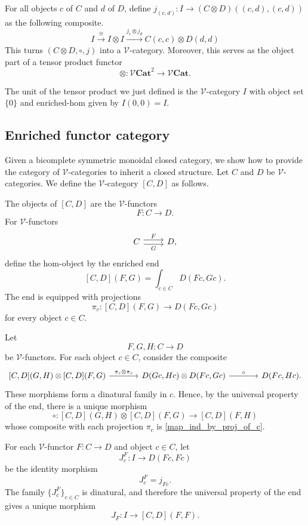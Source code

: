 \documentclass{tac}
\begin{document}
For all objects $c$ of $C$ and $d$ of $D$, define $j_{(c,d)}:I\to (C\otimes D)((c,d),(c,d))$ as the following composite.
\[
I\xrightarrow{\cong}I\otimes I\xrightarrow{j_c\otimes j_d}C(c,c)\otimes D(d,d)
\]
This turns $(C\otimes D,\circ,j)$ into a $\mathcal{V}$-category. Moreover, this serves as the object part of a tensor product functor 
\[
\otimes:\mathcal{V}\mathbf{Cat}^2\to\mathcal{V}\mathbf{Cat}.
\]

The unit of the tensor product we just defined is the $\mathcal{V}$-category $I$ with object set $\{0\}$ and enriched-hom given by $I(0,0)=I$.

\subsection*{Enriched functor category}
Given a bicomplete symmetric monoidal closed category, we show how to provide the category of
$\mathcal{V}$-categories to inherit a closed structure. Let $C$ and $D$ be $\mathcal{V}$-categories. We define the
$\mathcal{V}$-category $[C,D]$ as follows.

The objects of $[C,D]$ are the $\mathcal{V}$-functors
\[
F:C\longrightarrow D.
\]
For $\mathcal{V}$-functors 
\[
\begin{tikzcd}
C
  \arrow[r, shift left=0.6ex, "F"]
  \arrow[r, shift right=0.6ex, swap, "G"]
&
D,
\end{tikzcd}
\]
define the hom-object by
the enriched end
\[
[C,D](F,G)=\int_{c\in C}D(Fc,Gc).
\]
The end is equipped with projections
\[
\pi_c:[C,D](F,G)\longrightarrow D(Fc,Gc)
\]
for every object $c\in C$.

Let
\[
F,G,H:C\longrightarrow D
\]
be $\mathcal{V}$-functors. For each object $c\in C$, consider the composite
\begin{equation}\label{map_ind_by_proj_of_c}
\begin{tikzcd}[column sep=large]
[C,D](G,H)\otimes[C,D](F,G)
\arrow[r, "\pi_c\otimes\pi_c"]
&
D(Gc,Hc)\otimes D(Fc,Gc)
\arrow[r, "\circ"]
&
D(Fc,Hc).
\end{tikzcd}
\end{equation}
These morphisms form a dinatural family in $c$. Hence, by the universal
property of the end, there is a unique morphism
\[
\circ:
[C,D](G,H)\otimes[C,D](F,G)
\longrightarrow
[C,D](F,H)
\]
whose composite with each projection $\pi_c$ is \ref{map_ind_by_proj_of_c}.

For each $\mathcal{V}$-functor $F:C\longrightarrow D$ and object $c\in C$,
let
\[
J^F_c:I\longrightarrow D(Fc,Fc)
\]
be the identity morphism
\[
J^F_c=j_{Fc}.
\]
The family $\{J^F_c\}_{c\in C}$ is dinatural, and therefore the universal
property of the end gives a unique morphism
\[
J_F:I\longrightarrow[C,D](F,F).
\]
\end{document}
